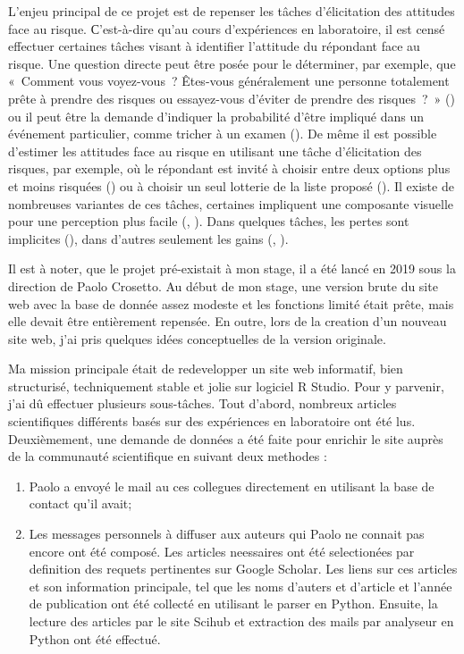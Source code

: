 \documentclass[12pt]{article}
\begin{document}
L'enjeu principal de ce projet est de repenser les tâches d'élicitation
des attitudes face au risque. С'est-à-dire qu'au cours d'expériences en
laboratoire, il est censé effectuer certaines tâches visant à identifier
l'attitude du répondant face au risque. Une question directe peut être
posée pour le déterminer, par exemple, que «~Comment vous voyez-vous~?
Êtes-vous généralement une personne totalement prête à prendre des
risques ou essayez-vous d'éviter de prendre des risques~?~»
(\citet{SOEP2007}) ou il peut être la demande d'indiquer la probabilité
d'être impliqué dans un événement particulier, comme tricher à un examen
(\citet{Blais2006}). De même il est possible d'estimer les attitudes
face au risque en utilisant une tâche d'élicitation des risques, par
exemple, où le répondant est invité à choisir entre deux options plus et
moins risquées (\citet{Holt2002}) ou à choisir un seul lotterie de la
liste proposé (\citet{Eckel2002}). Il existe de nombreuses variantes de
ces tâches, certaines impliquent une composante visuelle pour une
perception plus facile (\citet{Hunt2005}, \citet{Crosetto2013}). Dans
quelques tâches, les pertes sont implicites
(\citet{Menkhoff_Sakha_2017}), dans d'autres seulement les gains
(\citet{Eckel2002}, \citet{Holt2002}).

Il est à noter, que le projet pré-existait à mon stage, il a été lancé
en 2019 sous la direction de Paolo Crosetto. Au début de mon stage, une
version brute du site web avec la base de donnée assez modeste et les
fonctions limité était prête, mais elle devait être entièrement
repensée. En outre, lors de la creation d'un nouveau site web, j'ai pris
quelques idées conceptuelles de la version originale.

Ma mission principale était de redevelopper un site web informatif, bien
structurisé, techniquement stable et jolie sur logiciel R Studio. Pour y
parvenir, j'ai dû effectuer plusieurs sous-tâches. Tout d'abord,
nombreux articles scientifiques différents basés sur des expériences en
laboratoire ont été lus. Deuxièmement, une demande de données a été
faite pour enrichir le site auprès de la communauté scientifique en
suivant deux methodes :

\begin{enumerate}
\item Paolo a envoyé le mail au ces collegues directement en utilisant la base de contact qu'il avait;
\item Les messages personnels à diffuser aux auteurs qui Paolo ne connait pas encore ont été composé. Les articles neessaires ont été selectionées par definition des requets pertinentes sur Google Scholar. Les liens sur ces articles et son information principale, tel que les noms d'auters et d'article et l'année de publication ont été collecté en utilisant le parser en Python. Ensuite, la lecture des articles par le site Scihub et extraction des mails par analyseur en Python ont été effectué. 
\end{enumerate}
\end{document}

